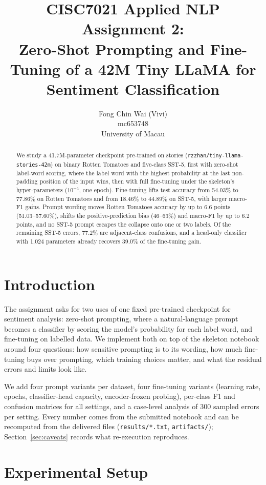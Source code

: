 \documentclass[11pt]{article}
\title{CISC7021 Applied NLP Assignment 2: \\ Zero-Shot Prompting and Fine-Tuning of a 42M Tiny LLaMA for Sentiment Classification}
\author{Fong Chin Wai (Vivi) \\
  mc653748 \\
  University of Macau}
\begin{document}
\maketitle

\begin{abstract}
We study a 41.7M-parameter checkpoint pre-trained on stories
(\texttt{rzzhan/tiny-llama-stories-42m}) on binary Rotten Tomatoes and five-class SST-5, first
with zero-shot label-word scoring, where the label word with the highest probability at the last
non-padding position of the input wins, then with full fine-tuning under the skeleton's
hyper-parameters ($10^{-4}$, one epoch). Fine-tuning lifts test accuracy from 54.03\% to 77.86\% on Rotten
Tomatoes and from 18.46\% to 44.89\% on SST-5, with larger macro-F1 gains. Prompt wording moves
Rotten Tomatoes accuracy by up to 6.6 points (51.03--57.60\%), shifts the positive-prediction
bias (46--63\%) and macro-F1 by up to 6.2 points, and no SST-5 prompt escapes the collapse onto
one or two labels. Of the remaining SST-5 errors, 77.2\% are adjacent-class confusions, and
a head-only classifier with 1{,}024 parameters already recovers 39.0\% of the fine-tuning gain.
\end{abstract}

\section{Introduction}
The assignment asks for two uses of one fixed pre-trained checkpoint for sentiment analysis:
zero-shot prompting, where a natural-language prompt becomes a classifier by scoring the model's
probability for each label word, and fine-tuning on labelled data. We implement both on top of
the skeleton notebook around four questions: how sensitive prompting is to its wording, how much
fine-tuning buys over prompting, which training choices matter, and what the residual errors and
limits look like.

We add four prompt variants per dataset, four fine-tuning variants (learning rate, epochs,
classifier-head capacity, encoder-frozen probing), per-class F1 and confusion matrices for all
settings, and a case-level analysis of 300 sampled errors per setting. Every number comes from
the submitted notebook and can be recomputed from the delivered files
(\texttt{results/*.txt}, \texttt{artifacts/}); Section~\ref{sec:caveats} records what
re-execution reproduces.

\section{Experimental Setup}
\end{document}
